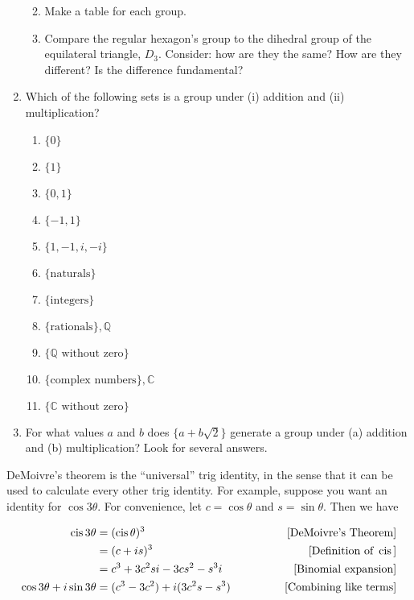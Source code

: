 \documentclass[../gatm.tex]{subfiles}
\begin{document}
\begin{enumerate}
\begin{enumerate}
\begin{multicols}{2}
\end{multicols}
\item Make a table for each group.
\item Compare the regular hexagon's group to the dihedral group of the equilateral triangle, $D_3$. Consider: how are they the same? How are they different? Is the difference fundamental?
\end{enumerate}
\item Which of the following sets is a group under (i) addition and (ii) multiplication?
\begin{multicols}{3}
\begin{enumerate}
\item $\{0\}$
\item $\{1\}$
\item $\{0,1\}$
\item $\{-1,1\}$
\item $\{1, -1, i, -i\}$
\item $\{\text{naturals}\}$
\item $\{\text{integers}\}$
\item $\{\text{rationals}\}, \mathbb{Q}$
\item $\{\mathbb{Q}\text{ without zero}\}$
\item $\{\text{complex numbers}\}, \mathbb{C}$
\item $\{\mathbb{C}\text{ without zero}\}$
\end{enumerate}
\end{multicols}
\item For what values $a$ and $b$ does $\{a + b\sqrt{2}\}$ generate a group under (a) addition and (b) multiplication? Look for several answers.

\setcounter{cg_problem_i}{\value{enumi}}
\end{enumerate}

DeMoivre's theorem is the ``universal'' trig identity, in the sense that it can be used to calculate every other trig identity. For example, suppose you want an identity for $\cos 3\theta$. For convenience, let $c=\cos\theta$ and $s=\sin\theta$. Then we have

\begin{align*}
\operatorname{cis} 3\theta &= (\operatorname{cis} \theta)^3  & \qquad \text{[DeMoivre's Theorem]} \\
&= (c+is)^3 & \qquad \text{[Definition of } \operatorname{cis} \text{]} \\
&= c^3 + 3c^2s i - 3cs^2 - s^3 i & \qquad \text{[Binomial expansion]} \\
\cos 3\theta + i\sin 3\theta &= (c^3 - 3c^2) + i (3c^2 s - s^3) \qquad & \text{[Combining like terms]}\\
\end{align*}
\end{document}
